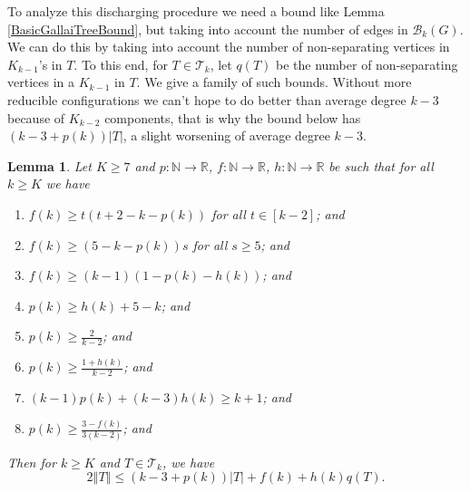 \documentclass[12pt]{article}
\theoremstyle{plain}
\newtheorem{lem}[thm]{Lemma}
\theoremstyle{definition}
\theoremstyle{remark}
\newcommand{\fancy}[1]{\mathcal{#1}}
\newcommand{\IN}{\mathbb{N}}
\newcommand{\IR}{\mathbb{R}}
\newcommand{\T}{\fancy{T}}
\newcommand{\B}{\fancy{B}}
\newcommand{\card}[1]{\left|#1\right|}
\newcommand{\size}[1]{\left\Vert#1\right\Vert}
\newcommand{\func}[3]{#1\colon #2 \rightarrow #3}
\newcommand{\irange}[1]{\left[#1\right]}
\begin{document}
To analyze this discharging procedure we need a bound like Lemma \ref{BasicGallaiTreeBound}, but taking into account the number of edges in $\B_k(G)$.  We can do this by taking into account the number of non-separating vertices in $K_{k-1}$'s in $T$.  To this end, for $T \in \T_k$, let $q(T)$ be the number of non-separating vertices in a $K_{k-1}$ in $T$.  We give a family of such bounds.  Without more reducible configurations we can't hope to do better than average degree $k-3$ because of $K_{k-2}$ components, that is why the bound below has $(k-3 + p(k))|T|$, a slight worsening of average degree $k-3$.

\begin{lem}\label{BoundFamily}
	Let $K \ge 7$ and $\func{p}{\IN}{\IR}$, $\func{f}{\IN}{\IR}$, $\func{h}{\IN}{\IR}$ be such that for all $k \ge K$ we have
	\begin{enumerate}
		\item $f(k) \ge t(t+2-k-p(k))$ for all $t \in \irange{k-2}$; and
    	\item $f(k) \ge (5-k-p(k))s$ for all $s \ge 5$; and
		\item $f(k) \ge (k-1)(1- p(k) - h(k))$; and	
		\item $p(k) \ge h(k) + 5 - k$; and
		\item $p(k) \ge \frac{2}{k-2}$; and
		\item $p(k) \ge \frac{1+h(k)}{k-2}$; and
		\item $(k-1)p(k) + (k-3)h(k) \ge k+1$; and
		\item $p(k) \ge \frac{3 - f(k)}{3(k-2)}$; and
	\end{enumerate}
	Then for $k \ge K$ and $T \in \T_k$, we have
	\[2\size{T} \le (k-3 + p(k))\card{T} + f(k) + h(k)q(T).\]
\end{lem}
\end{document}
